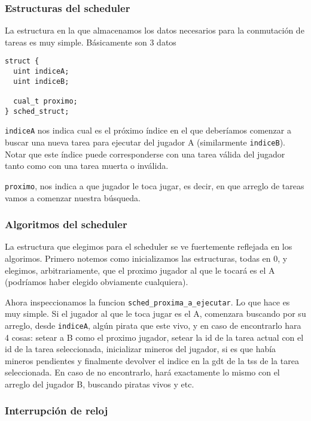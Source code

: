
 
\subsubsection*{Estructuras del scheduler}
 
La estructura en la que almacenamos los datos necesarios para la conmutación de tareas es muy simple. Básicamente son 3 datos

\begin{lstlisting}
struct {
  uint indiceA;
  uint indiceB;

  cual_t proximo;
} sched_struct;
\end{lstlisting}


\texttt{indiceA} nos indica cual es el próximo índice en el que deberíamos comenzar a buscar una nueva tarea para ejecutar del jugador A (similarmente \texttt{indiceB}). Notar que este índice puede corresponderse con una tarea válida del jugador tanto como con una tarea muerta o inválida.
 
\texttt{proximo}, nos indica a que jugador le toca jugar, es decir, en que arreglo de tareas vamos a comenzar nuestra búsqueda.
 
\subsubsection*{Algoritmos del scheduler}
 
La estructura que elegimos para el scheduler se ve fuertemente reflejada en los algorimos. Primero notemos como inicializamos las estructuras, todas en 0, y elegimos, arbitrariamente, que el proximo jugador al que le tocará es el A (podríamos haber elegido obviamente cualquiera).
 
Ahora inspeccionamos la funcion \texttt{sched_proxima_a_ejecutar}. Lo que hace es muy simple. 
Si el jugador al que le toca jugar es el A, comenzara buscando por su arreglo, desde \texttt{indiceA}, algún pirata que este vivo, y en caso de encontrarlo hara 4 cosas: setear a B como el proximo jugador, setear la id de la tarea actual con el id de la tarea seleccionada, inicializar mineros del jugador, si es que había mineros pendientes y finalmente devolver el indice en la gdt de la tss de la tarea seleccionada.
En caso de no encontrarlo, hará exactamente lo mismo con el arreglo del jugador B, buscando piratas vivos y etc.
 
\subsubsection*{Interrupción de reloj}
 
